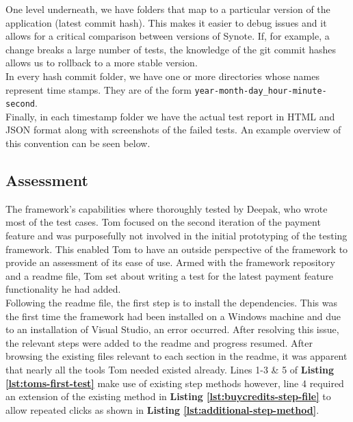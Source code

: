 One level underneath, we have folders that map to a particular version of the application (latest commit hash). This makes it easier to debug issues and it allows for a critical comparison between versions of Synote. If, for example, a change breaks a large number of tests, the knowledge of the git commit hashes allows us to rollback to a more stable version.
\\

In every hash commit folder, we have one or more directories whose names represent time stamps. They are of the form
\texttt{year-month-day\_hour-minute-second}.
\\

Finally, in each timestamp folder we have the actual test report in HTML and JSON format along with screenshots of the failed tests. An example overview of this convention can be seen below.
\\

\label{fig:reports-file-structure}

\subsection{Assessment}
\label{subsec:assessment}

The framework's capabilities where thoroughly tested by Deepak, who wrote most of the test cases. Tom focused on the second iteration of the payment feature and was purposefully not involved in the initial prototyping of the testing framework. This enabled Tom to have an outside perspective of the framework to provide an assessment of its ease of use. Armed with the framework repository and a readme file, Tom set about writing a test for the latest payment feature functionality he had added.\\

Following the readme file, the first step is to install the dependencies. This was the first time the framework had been installed on a Windows machine and due to an installation of Visual Studio, an error occurred. After resolving this issue, the relevant steps were added to the readme and progress resumed. After browsing the existing files relevant to each section in the readme, it was apparent that nearly all the tools Tom needed existed already. Lines 1-3 \& 5 of \textbf{Listing \ref{lst:toms-first-test}} make use of existing step methods however, line 4 required an extension of the existing method in \textbf{Listing \ref{lst:buycredits-step-file}} to allow repeated clicks as shown in \textbf{Listing \ref{lst:additional-step-method}}.\\

